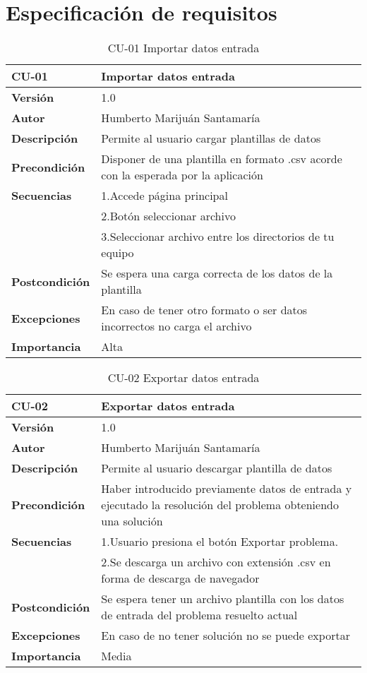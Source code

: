 \section{Especificación de requisitos}

\begin{table}[th!]
\begin{tabular}{  m{5cm}  m{7cm}  }
\hline \textbf{CU-01} & \textbf{Importar datos entrada} \\ 
\hline
\textbf{Versión} & 1.0\\
\textbf{Autor} & Humberto Marijuán Santamaría\\
\textbf{Descripción} & Permite al usuario cargar plantillas de datos\\
\textbf{Precondición} & Disponer de una plantilla en formato .csv acorde con la esperada por la aplicación\\
\textbf{Secuencias} & 1.Accede página principal \\ 
                    & 2.Botón seleccionar archivo \\
                    & 3.Seleccionar archivo entre los directorios de tu equipo \\
\textbf{Postcondición} & Se espera una carga correcta de los datos de la plantilla\\
\textbf{Excepciones} & En caso de tener otro formato o ser datos incorrectos no carga el archivo\\
\textbf{Importancia} & Alta\\
\hline
\end{tabular}
\caption{CU-01 Importar datos entrada}
\label{ref:tablacu_01}
\end{table}

\begin{table}[th!]
\begin{tabular}{  m{5cm}  m{7cm}  }
\hline \textbf{CU-02} & \textbf{Exportar datos entrada} \\ 
\hline
\textbf{Versión} & 1.0\\
\textbf{Autor} & Humberto Marijuán Santamaría\\
\textbf{Descripción} & Permite al usuario descargar plantilla de datos\\
\textbf{Precondición} & Haber introducido previamente datos de entrada y ejecutado la resolución del problema obteniendo una solución\\
\textbf{Secuencias} & 1.Usuario presiona el botón Exportar problema.\\ 
                    & 2.Se descarga un archivo con extensión .csv en forma de descarga de navegador \\
\textbf{Postcondición} & Se espera tener un archivo plantilla con los datos de entrada del problema resuelto actual\\
\textbf{Excepciones} & En caso de no tener solución no se puede exportar\\
\textbf{Importancia} & Media\\
\hline
\end{tabular}
\caption{CU-02 Exportar datos entrada}
\label{ref:tablacu_02}
\end{table}

